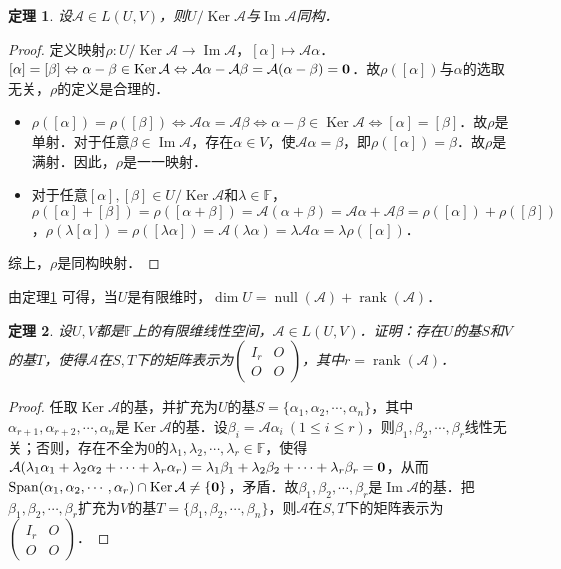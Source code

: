 \documentclass[a4paper,fontset=windows]{ctexbook}
\newtheorem{theorem}{定理}[chapter]
\theoremstyle{definition}
\DeclareMathOperator{\im}{Im}
\DeclareMathOperator{\Ker}{Ker}
\DeclareMathOperator{\Null}{null}
\DeclareMathOperator{\rank}{rank}
\DeclareMathOperator{\Span}{Span}
\renewcommand{\le}{\leqslant}
\begin{document}
\begin{theorem}\label{thm9.10}
设$\mathcal{A}\in L(U,V)$，则$U/\Ker\mathcal{A}$与$\im\mathcal{A}$同构．
\end{theorem}

\begin{proof}
定义映射$\rho:U/\Ker\mathcal{A}\to\im\mathcal{A}$，$[\alpha]\mapsto\mathcal{A}\alpha$．$[\alpha]=[\beta]\Leftrightarrow\alpha-\beta\in\Ker\mathcal{A}\Leftrightarrow\mathcal{A}\alpha-\mathcal{A}\beta=\mathcal{A}(\alpha-\beta)={\bf 0}$．故$\rho([\alpha])$与$\alpha$的选取无关，$\rho$的定义是合理的．
\begin{itemize}
\item $\rho([\alpha])=\rho([\beta])\Leftrightarrow\mathcal{A}\alpha=\mathcal{A}\beta\Leftrightarrow\alpha-\beta\in\Ker\mathcal{A}\Leftrightarrow[\alpha]=[\beta]$．故$\rho$是单射．对于任意$\beta\in\im\mathcal{A}$，存在$\alpha\in V$，使$\mathcal{A}\alpha=\beta$，即$\rho([\alpha])=\beta$．故$\rho$是满射．因此，$\rho$是一一映射．

\item 对于任意$[\alpha],[\beta]\in U/\Ker\mathcal{A}$和$\lambda\in\mathbb{F}$，$\rho([\alpha]+[\beta])=\rho([\alpha+\beta])=\mathcal{A}(\alpha+\beta)=\mathcal{A}\alpha+\mathcal{A}\beta=\rho([\alpha])+\rho([\beta])$，$\rho(\lambda[\alpha])=\rho([\lambda\alpha])=\mathcal{A}(\lambda\alpha)=\lambda\mathcal{A}\alpha=\lambda\rho([\alpha])$．
\end{itemize}
综上，$\rho$是同构映射．
\end{proof}

由定理\ref{thm9.10} 可得，当$U$是有限维时，$\dim U=\Null(\mathcal{A})+\rank(\mathcal{A})$．

\begin{theorem}
设$U,V$都是$\mathbb{F}$上的有限维线性空间，$\mathcal{A}\in L(U,V)$．证明：存在$U$的基$S$和$V$的基$T$，使得$\mathcal{A}$在$S,T$下的矩阵表示为$\begin{pmatrix}I_r&O \\ O&O\end{pmatrix}$，其中$r=\rank(\mathcal{A})$．
\end{theorem}

\begin{proof}
任取$\Ker\mathcal{A}$的基，并扩充为$U$的基$S=\{\alpha_1,\alpha_2,\cdots,\alpha_n\}$，其中$\alpha_{r+1},\alpha_{r+2},\cdots,\alpha_n$是$\Ker\mathcal{A}$的基．设$\beta_i=\mathcal{A}\alpha_i~(1\le i\le r)$，则$\beta_1,\beta_2,\cdots,\beta_r$线性无关；否则，存在不全为0的$\lambda_1,\lambda_2,\cdots,\lambda_r\in\mathbb{F}$，使得$\mathcal{A}(\lambda_1\alpha_1+\lambda_2\alpha_2+\cdots+\lambda_r\alpha_r)=\lambda_1\beta_1+\lambda_2\beta_2+\cdots+\lambda_r\beta_r={\bf 0}$，从而$\Span(\alpha_1,\alpha_2,\cdots,\alpha_r)\cap\Ker\mathcal{A} \\ \ne\{\bf 0\}$，矛盾．故$\beta_1,\beta_2,\cdots,\beta_r$是$\im\mathcal{A}$的基．把$\beta_1,\beta_2,\cdots,\beta_r$扩充为$V$的基$T=\{\beta_1,\beta_2,\cdots,\beta_n\}$，则$\mathcal{A}$在$S,T$下的矩阵表示为$\begin{pmatrix}I_r&O \\ O&O\end{pmatrix}$．
\end{proof}
\end{document}

